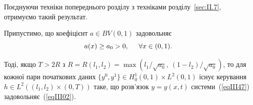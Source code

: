 Поєднуючи техніки попереднього розділу з техніками розділу~\ref{sec:II.7}, отримуємо такий результат.

\begin{theorem}
\label{theorem:III.3.3}
Припустимо, що коефіцієнт $a \in BV(0,1)$ задовольняє
\begin{equation}\label{eqIII48}
    a(x) \geq a_0 > 0, \hspace{0.5cm} \forall x \in (0,1).
\end{equation}

Тоді, якщо $T > 2R$ з $R = R(l_1, l_2) = \max\left(l_1/\sqrt{a_0},\ (1-l_2)/\sqrt{a_0}\right)$, то для кожної пари початкових даних $\{y^0, y^1\} \in H^1_0(0,1) \times L^2(0,1)$ існує керування $h \in L^2((l_1, l_2) \times (0,T))$ таке, що розв'язок $y = y(x,t)$ системи~(\ref{eqIII47}) задовольняє~(\ref{eqIII02}).
\end{theorem}


